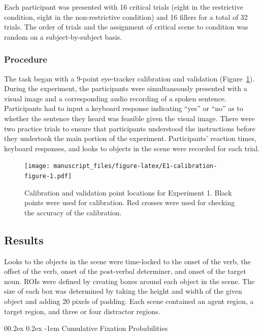 \documentclass[
  man,floatsintext]{apa6}
\makeatletter
\let\oldparagraph\paragraph
\renewcommand{\paragraph}[1]{\oldparagraph{#1}\mbox{}}
\renewcommand{\paragraph}{\@startsection{paragraph}{4}{\parindent}%
  {0\baselineskip \@plus 0.2ex \@minus 0.2ex}%
  {-1em}%
  {\normalfont\normalsize\bfseries\itshape\typesectitle}}
\makeatother
\begin{document}
Each participant was presented with 16 critical trials (eight in
the restrictive condition, eight in the non-restrictive condition) and
16 fillers for a total of 32 trials. The order of trials and the
assignment of critical scene to condition was random on a
subject-by-subject basis.

\subsubsection{Procedure}\label{procedure}

The task began with a 9-point eye-tracker calibration
and validation (Figure~\ref{fig:E1-calibration-figure}).
During the experiment, the participants were
simultaneously presented with a visual image and a corresponding audio
recording of a spoken sentence. Participants had to input a keyboard
response indicating ``yes'' or ``no'' as to whether the sentence they heard
was feasible given the visual image. There were two practice trials to
ensure that participants understood the instructions
before they undertook the main portion of the experiment. Participants'
reaction times, keyboard responses, and looks to objects in the scene
were recorded for each trial.

\begin{figure}
\centering
\texttt{[image: manuscript\_files/figure-latex/E1-calibration-figure-1.pdf]}
\caption{\label{fig:E1-calibration-figure}Calibration and validation point locations for Experiment 1. Black points were used for calibration. Red crosses were used for checking the accuracy of the calibration.}
\end{figure}

\subsection{Results}\label{results}

Looks to the objects in the scene were time-locked to the onset of the
verb, the offset of the verb, onset of the post-verbal determiner, and
onset of the target noun. ROIs were defined by creating boxes around each object in the scene. The size of each box was determined by taking the height and width of the given object and adding 20 pixels of padding. Each scene contained an agent region, a target region, and three or four distractor regions.

\paragraph{Cumulative Fixation Probabilities}\label{cumulative-fixation-probabilities}
\end{document}
